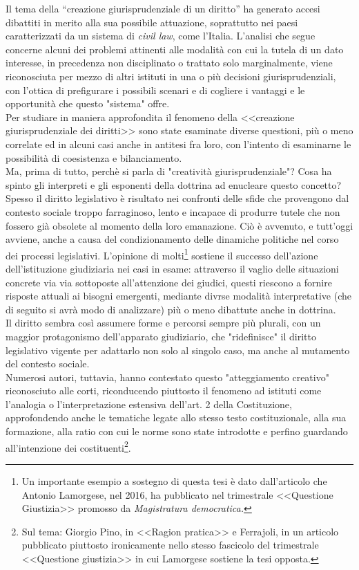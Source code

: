 Il tema della “creazione giurisprudenziale di un diritto” ha generato accesi dibattiti in merito alla sua possibile attuazione, soprattutto nei paesi caratterizzati da un sistema di \textit{civil law}, come l’Italia.
L'analisi che segue concerne alcuni dei problemi attinenti alle modalità con cui la tutela di un dato interesse, in precedenza non disciplinato o trattato solo marginalmente, viene riconosciuta per mezzo di altri istituti in una o più decisioni giurisprudenziali, con l'ottica di prefigurare i possibili scenari e di cogliere i vantaggi e le opportunità che questo "sistema" offre.
\\Per studiare in maniera approfondita il fenomeno della <<creazione giurisprudenziale dei diritti>> sono state esaminate diverse questioni, più o meno correlate ed in alcuni casi anche in antitesi fra loro, con l'intento di esaminarne le possibilità di coesistenza e bilanciamento.
\\Ma, prima di tutto, perchè si parla di "creatività giurisprudenziale"? Cosa ha spinto gli interpreti e gli esponenti della dottrina ad enucleare questo concetto?
\\Spesso il diritto legislativo è risultato nei confronti delle sfide che provengono dal contesto sociale troppo farraginoso, lento e incapace di produrre tutele che non fossero già obsolete al momento della loro emanazione. Ciò è avvenuto, e tutt'oggi avviene, anche a causa del condizionamento delle dinamiche politiche nel corso dei processi legislativi.
L'opinione di molti\footnote{Un importante esempio a sostegno di questa tesi è dato dall'articolo che Antonio Lamorgese, nel 2016, ha pubblicato nel trimestrale <<Questione Giustizia>> promosso da \textit{Magistratura democratica.}} sostiene il successo dell'azione dell'istituzione giudiziaria nei casi in esame: attraverso il vaglio delle situazioni concrete via via sottoposte all'attenzione dei giudici, questi riescono a fornire risposte attuali ai bisogni emergenti, mediante divrse modalità interpretative (che di seguito si avrà modo di analizzare) più o meno dibattute anche in dottrina.
\\Il diritto sembra così assumere forme e percorsi sempre più plurali, con un maggior protagonismo dell'apparato giudiziario, che "ridefinisce" il diritto legislativo vigente per adattarlo non solo al singolo caso, ma anche al mutamento del contesto sociale.
\\Numerosi autori, tuttavia, hanno contestato questo "atteggiamento creativo" riconosciuto alle corti, riconducendo piuttosto il fenomeno ad istituti come l'analogia o l'interpretazione estensiva dell'art. 2 della Costituzione, approfondendo anche le tematiche legate allo stesso testo costituzionale, alla sua formazione, alla ratio con cui le norme sono state introdotte e perfino guardando all'intenzione dei costituenti\footnote{Sul tema: Giorgio Pino, in <<Ragion pratica>> e Ferrajoli, in un articolo pubblicato piuttosto ironicamente nello stesso fascicolo del trimestrale <<Questione giustizia>> in cui Lamorgese sostiene la tesi opposta.}.
